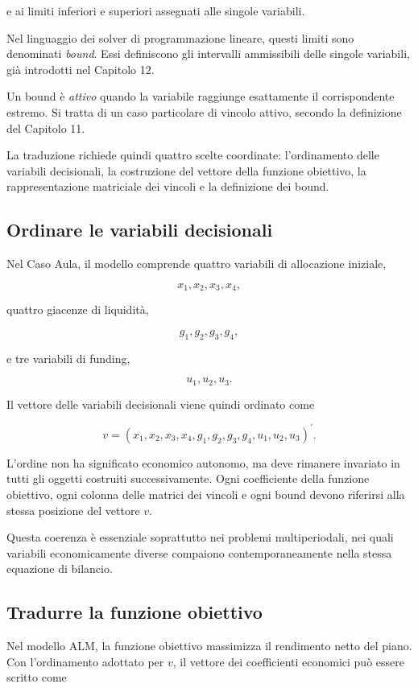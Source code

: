 \noindent e ai limiti inferiori e superiori assegnati alle singole variabili.

Nel linguaggio dei solver di programmazione lineare,
questi limiti sono denominati \emph{bound}.
Essi definiscono gli intervalli ammissibili delle
singole variabili, gi\`{a} introdotti nel Capitolo 12.

Un bound \`{e} \emph{attivo} quando la variabile
raggiunge esattamente il corrispondente estremo.
Si tratta di un caso particolare di vincolo attivo,
secondo la definizione del Capitolo 11.


La traduzione richiede quindi quattro scelte coordinate: l'ordinamento delle
variabili decisionali, la costruzione del vettore della funzione obiettivo,
la rappresentazione matriciale dei vincoli e la definizione dei bound.

\subsection{Ordinare le variabili decisionali}

Nel Caso Aula, il modello comprende quattro variabili di allocazione iniziale,

\[
x_1,x_2,x_3,x_4,
\]

\noindent quattro giacenze di liquidit\`a,

\[
g_1,g_2,g_3,g_4,
\]

\noindent e tre variabili di funding,

\[
u_1,u_2,u_3.
\]

Il vettore delle variabili decisionali viene quindi ordinato come

\[
v=
\left(
x_1,x_2,x_3,x_4,
g_1,g_2,g_3,g_4,
u_1,u_2,u_3
\right)^{\prime}.
\]

L'ordine non ha significato economico autonomo, ma deve rimanere invariato in
tutti gli oggetti costruiti successivamente. Ogni coefficiente della funzione
obiettivo, ogni colonna delle matrici dei vincoli e ogni bound devono riferirsi
alla stessa posizione del vettore $v$.

Questa coerenza \`e essenziale soprattutto nei problemi multiperiodali, nei
quali variabili economicamente diverse compaiono contemporaneamente nella
stessa equazione di bilancio.

\subsection{Tradurre la funzione obiettivo}

Nel modello ALM, la funzione obiettivo massimizza il rendimento netto del
piano. Con l'ordinamento adottato per $v$, il vettore dei coefficienti
economici pu\`o essere scritto come

